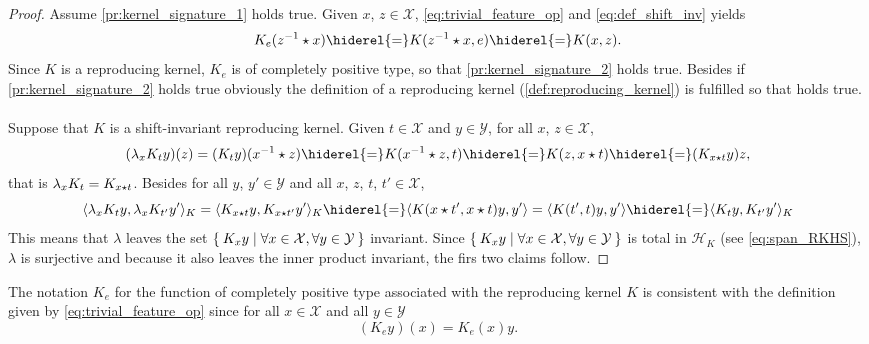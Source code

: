 \begin{proof} Assume \cref{pr:kernel_signature_1} holds true. Given $x$, $z\in\mathcal{X}$, \cref{eq:trivial_feature_op} and \cref{eq:def_shift_inv} yields
\begin{dmath*}
K_e(\inv{z}\groupop x)\hiderel{=}K(\inv{z} \groupop x,e)\hiderel{=}K(x,z).
\end{dmath*}
Since $K$ is a reproducing kernel, $K_e$ is of completely positive type, so that \cref{pr:kernel_signature_2} holds true. Besides if \cref{pr:kernel_signature_2} holds true obviously the definition of a reproducing kernel (\cref{def:reproducing_kernel}) is fulfilled so that \label{pr:kernel_signature_1} holds true.
\paragraph{}
Suppose that $K$ is a shift-invariant reproducing kernel. Given $t\in\mathcal{X}$ and $y\in\mathcal{Y}$, for all $x$, $z\in\mathcal{X}$,
\begin{dmath*}
(\lambda_xK_ty)(z)=(K_ty)(\inv{x}\groupop z)\hiderel{=}K(\inv{x}\groupop z,t)\hiderel{=}K(z,x\groupop t)\hiderel{=}(K_{x\groupop t}y)z,
\end{dmath*}
that is $\lambda_xK_t=K_{x\star t}$. Besides for all $y$, $y'\in\mathcal{Y}$ and all $x$, $z$, $t$, $t'\in\mathcal{X}$,
\begin{dmath*}
\inner{\lambda_xK_ty, \lambda_xK_{t'}y'}_K=\inner{K_{x\groupop t}y, K_{x \groupop t'}y'}_K\hiderel{=}\inner{K(x \groupop t', x \groupop t)y,y'}=\inner{K(t',t)y, y'}\hiderel{=}\inner{K_ty, K_{t'}y'}_K
\end{dmath*}
This means that $\lambda$ leaves the set $\Set{K_xy|\forall x\in\mathcal{X}, \forall y\in\mathcal{Y}}$ invariant.
Since $\Set{K_xy|\forall x\in\mathcal{X}, \forall y\in\mathcal{Y}}$ is total in $\mathcal{H}_K$ (see \cref{eq:span_RKHS}), $\lambda$ is surjective and because it also leaves the inner product invariant, the firs two claims follow.
\end{proof}
The notation $K_e$ for the function of completely positive type associated with the reproducing kernel $K$
is consistent with the definition given by \cref{eq:trivial_feature_op} since for all $x\in\mathcal{X}$ and all $y\in\mathcal{Y}$
\begin{dmath*}
(K_ey)(x)=K_e(x)y.
\end{dmath*}

